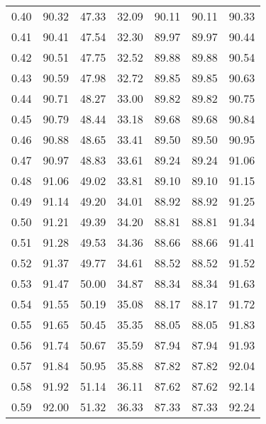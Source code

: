 \begin{tabular}{|c|c|c|c|c|c|c|}
      0.40 &     90.32 &     47.33 &      32.09 &   90.11 &      90.11 &         90.33 \\
      0.41 &     90.41 &     47.54 &      32.30 &   89.97 &      89.97 &         90.44 \\
      0.42 &     90.51 &     47.75 &      32.52 &   89.88 &      89.88 &         90.54 \\
      0.43 &     90.59 &     47.98 &      32.72 &   89.85 &      89.85 &         90.63 \\
      0.44 &     90.71 &     48.27 &      33.00 &   89.82 &      89.82 &         90.75 \\
      0.45 &     90.79 &     48.44 &      33.18 &   89.68 &      89.68 &         90.84 \\
      0.46 &     90.88 &     48.65 &      33.41 &   89.50 &      89.50 &         90.95 \\
      0.47 &     90.97 &     48.83 &      33.61 &   89.24 &      89.24 &         91.06 \\
      0.48 &     91.06 &     49.02 &      33.81 &   89.10 &      89.10 &         91.15 \\
      0.49 &     91.14 &     49.20 &      34.01 &   88.92 &      88.92 &         91.25 \\
      0.50 &     91.21 &     49.39 &      34.20 &   88.81 &      88.81 &         91.34 \\
      0.51 &     91.28 &     49.53 &      34.36 &   88.66 &      88.66 &         91.41 \\
      0.52 &     91.37 &     49.77 &      34.61 &   88.52 &      88.52 &         91.52 \\
      0.53 &     91.47 &     50.00 &      34.87 &   88.34 &      88.34 &         91.63 \\
      0.54 &     91.55 &     50.19 &      35.08 &   88.17 &      88.17 &         91.72 \\
      0.55 &     91.65 &     50.45 &      35.35 &   88.05 &      88.05 &         91.83 \\
      0.56 &     91.74 &     50.67 &      35.59 &   87.94 &      87.94 &         91.93 \\
      0.57 &     91.84 &     50.95 &      35.88 &   87.82 &      87.82 &         92.04 \\
      0.58 &     91.92 &     51.14 &      36.11 &   87.62 &      87.62 &         92.14 \\
      0.59 &     92.00 &     51.32 &      36.33 &   87.33 &      87.33 &         92.24 \\

\end{tabular}
